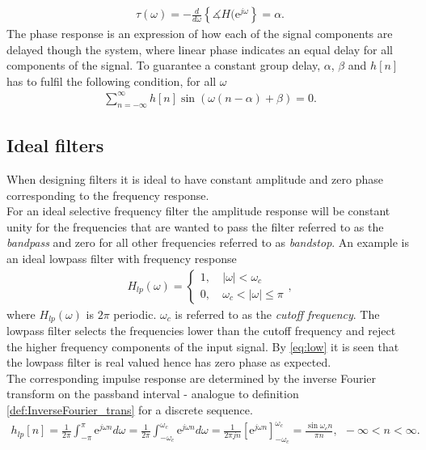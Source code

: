 \begin{align}
\tau(\omega)=-\frac{d}{d\omega}\left\{ \measuredangle H(\text{e}^{j\omega} \right\} = \alpha.
\end{align}
The phase response is an expression of how each of the signal components are delayed though the system, where linear phase indicates an equal delay for all components of the signal. To guarantee a constant group delay, $\alpha$, $\beta$ and $h[n]$ has to fulfil the following condition, for all $\omega$ \cite{DTSP, page 341}
\begin{align}\label{eq:cons_gro}
\sum_{n=-\infty}^{\infty}h[n]\sin\left(\omega \left(n-\alpha \right) + \beta \right) = 0.
\end{align}

\subsection{Ideal filters} \label{sec:ideal_filt}
When designing filters it is ideal to have constant amplitude and zero phase corresponding to the frequency response. \\ For an ideal selective frequency filter the amplitude response will be constant unity for the frequencies that are wanted to pass the filter referred to as the \textit{bandpass} and zero for all other frequencies referred to as \textit{bandstop}. An example is an ideal lowpass filter with frequency response 
\begin{align}\label{eq:low}
H_{lp}(\omega)=
\left\{ \begin{matrix}
1, &\ \left| \omega \right|< \omega_c \\
0, &\ \omega_c < \left| \omega \right| \leq \pi
\end{matrix}\right.,
\end{align}     
where $H_{lp}(\omega)$ is $2\pi$ periodic. $\omega_c$ is referred to as the \textit{cutoff frequency}. The lowpass filter selects the frequencies lower than the cutoff frequency and reject the higher frequency components of the input signal. By \eqref{eq:low} it is seen that the lowpass filter is real valued hence has zero phase as expected. \\
The corresponding impulse response are determined by the inverse Fourier transform on the passband interval - analogue to definition \ref{def:InverseFourier_trans} for a discrete sequence.
\begin{align}\label{eq:low_im}
h_{lp}[n]= \frac{1}{2\pi}\int_{-\pi}^{\pi}\text{e}^{j\omega n} d\omega =\frac{1}{2\pi}\int_{-\omega_c}^{\omega_c}\text{e}^{j\omega n} d\omega = \frac{1}{2\pi j n}\left[\text{e}^{j\omega n} \right]_{-\omega_c}^{\omega_c} = \frac{\sin \omega_c n}{\pi n }, \ \  -\infty < n < \infty.
\end{align} 
